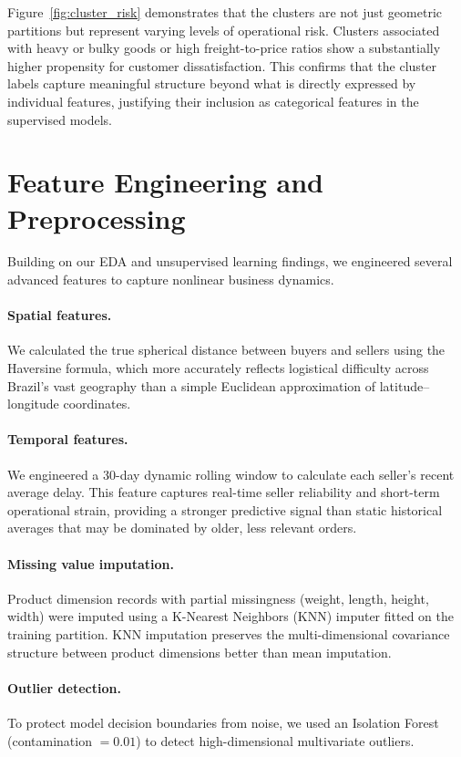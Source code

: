 \documentclass[11pt]{article}
\begin{document}
Figure~\ref{fig:cluster_risk} demonstrates that the clusters are not just geometric partitions but represent varying levels of operational risk. Clusters associated with heavy or bulky goods or high freight-to-price ratios show a substantially higher propensity for customer dissatisfaction. This confirms that the cluster labels capture meaningful structure beyond what is directly expressed by individual features, justifying their inclusion as categorical features in the supervised models.

\section{Feature Engineering and Preprocessing}

Building on our EDA and unsupervised learning findings, we engineered several advanced features to capture nonlinear business dynamics.

\paragraph{Spatial features.}
We calculated the true spherical distance between buyers and sellers using the Haversine formula, which more accurately reflects logistical difficulty across Brazil's vast geography than a simple Euclidean approximation of latitude--longitude coordinates.

\paragraph{Temporal features.}
We engineered a 30-day dynamic rolling window to calculate each seller's recent average delay. This feature captures real-time seller reliability and short-term operational strain, providing a stronger predictive signal than static historical averages that may be dominated by older, less relevant orders.

\paragraph{Missing value imputation.}
Product dimension records with partial missingness (weight, length, height, width) were imputed using a K-Nearest Neighbors (KNN) imputer fitted on the training partition. KNN imputation preserves the multi-dimensional covariance structure between product dimensions better than mean imputation.

\paragraph{Outlier detection.}
To protect model decision boundaries from noise, we used an Isolation Forest (contamination $= 0.01$) to detect high-dimensional multivariate outliers.
\end{document}
